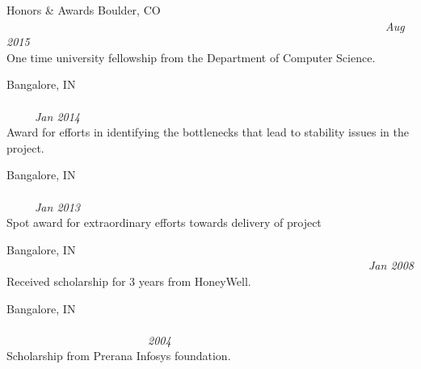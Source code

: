 \documentclass{resume}
\begin{document}
\begin{category}{Honors \& Awards}
 Boulder, CO
~~~~~~~~~~~~~~~~~~~~~~~~~~~~~~~~~~~~~~~~~~~~~~~~~~~~~~~~~~~~~~~~~~~\textit{Aug 2015}\\
One time university fellowship from the Department of Computer Science.

 Bangalore, IN ~~~~~~~~~~~~~~~~~~~~~~~~~~~~~~~~~~~~~~~~~~~~~~~~~~~~~~~~~~~~~~~~~~~~~~~~~~~~~\textit{Jan 2014}\\
Award for efforts in identifying the bottlenecks that lead to stability issues in the project.

 Bangalore, IN ~~~~~~~~~~~~~~~~~~~~~~~~~~~~~~~~~~~~~~~~~~~~~~~~~~~~~~~~~~~~~~~~~~~~~~~~~~~~~\textit{Jan 2013}\\
Spot award for extra­ordinary efforts towards delivery of project

 Bangalore, IN ~~~~~~~~~~~~~~~~~~~~~~~~~~~~~~~~~~~~~~~~~~~~~~~~~~~~~~~~~~~~~~~~\textit{Jan 2008}\\
Received scholarship for 3 years from HoneyWell.

 Bangalore, IN ~~~~~~~~~~~~~~~~~~~~~~~~~~~~~~~~~~~~~~~~~~~~~~~~~~~~~~~~~~~~~~~~~~~~~~~~~~~~~~~~~~~~~~~~~~~~~~~~~\textit{2004}\\
Scholarship from Prerana Infosys foundation.

\end{category}
\end{document}
